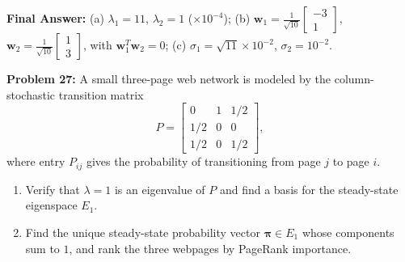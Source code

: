 \documentclass[11pt, letterpaper]{article}
\theoremstyle{definition}
\theoremstyle{remark}
\begin{document}
\textbf{Final Answer:} (a) $\lambda_1 = 11$, $\lambda_2 = 1$ ($\times 10^{-4}$); (b) $\mathbf{w}_1 = \frac{1}{\sqrt{10}}\begin{bmatrix} -3 \\ 1 \end{bmatrix}$, $\mathbf{w}_2 = \frac{1}{\sqrt{10}}\begin{bmatrix} 1 \\ 3 \end{bmatrix}$, with $\mathbf{w}_1^T\mathbf{w}_2 = 0$; (c) $\sigma_1 = \sqrt{11} \times 10^{-2}$, $\sigma_2 = 10^{-2}$.

\vspace{0.4em}
\textbf{Problem 27:}
A small three-page web network is modeled by the column-stochastic transition matrix
\[
P = \begin{bmatrix} 0 & 1 & 1/2 \\ 1/2 & 0 & 0 \\ 1/2 & 0 & 1/2 \end{bmatrix},
\]
where entry $P_{ij}$ gives the probability of transitioning from page $j$ to page $i$.
\begin{enumerate}[label=(\alph*)]
    \item Verify that $\lambda = 1$ is an eigenvalue of $P$ and find a basis for the steady-state eigenspace $E_1$.
    \item Find the unique steady-state probability vector $\boldsymbol{\pi} \in E_1$ whose components sum to $1$, and rank the three webpages by PageRank importance.
\end{enumerate}
\end{document}
